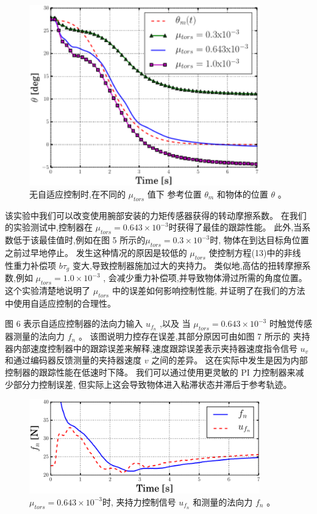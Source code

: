 \begin{figure}[!ht]
  \centering
  \includegraphics[width=10cm]{appendices/pic/5-2}
  \caption*{
     无自适应控制时,在不同的 $\mu_{tors}$ 值下
    参考位置 $\theta_m$ 和物体的位置 $\theta$ 。}
  \vspace{-0.3cm}
\end{figure}

该实验中我们可以改变使用腕部安装的力矩传感器获得的转动摩擦系数。
在我们的实验测试中,控制器在
${\mu _{tors}} = 0.643 \times {10^{ - 3}}$时获得了最佳的跟踪性能。
此外,当系数低于该最佳值时,例如在图 5 所示的${\mu _{tors}} = 0.3 \times {10^{ - 3}}$时,
物体在到达目标角位置之前过早地停止。
发生这种情况的原因是较低的 $\mu_{tors}$ 使控制方程(13)中的非线
性重力补偿项 $b \tau_g$ 变大,导致控制器施加过大的夹持力。
类似地,高估的扭转摩擦系数,例如 ${\mu _{tors}} = 1.0 \times {10^{ - 3}}$ ,
会减少重力补偿项,并导致物体滑过所需的角度位置。
这个实验清楚地说明了 $\mu_{tors}$ 中的误差如何影响控制性能,
并证明了在我们的方法中使用自适应控制的合理性。


图 6 表示自适应控制器的法向力输入 $u_{f_n}$ ,以及
当 ${\mu _{tors}} = 0.643 \times {10^{ - 3}}$ 时触觉传感器测量的法向力 $f_n$ 。
该图说明力控存在误差,其部分原因可由如图 7 所示的
夹持器内部速度控制器中的跟踪误差来解释,速度跟踪误差表示夹持器速度指令信号
$u_v$ 和通过编码器反馈测量的夹持器速度 $v$ 之间的差异。
这在实际中发生是因为内部控制器的跟踪性能在低速时下降。
我们可以通过使用更灵敏的 PI 力控制器来减少部分力控制误差,
但实际上这会导致物体进入粘滞状态并滞后于参考轨迹。

\begin{figure}[!ht]
  \centering
  \includegraphics[width=10cm]{appendices/pic/5-3}
  \caption*{
    ${\mu _{tors}} = 0.643 \times {10^{ - 3}}$时,
    夹持力控制信号 $u_{f_n}$ 和测量的法向力 $f_n$ 。}
  \vspace{-0.3cm}
\end{figure}

